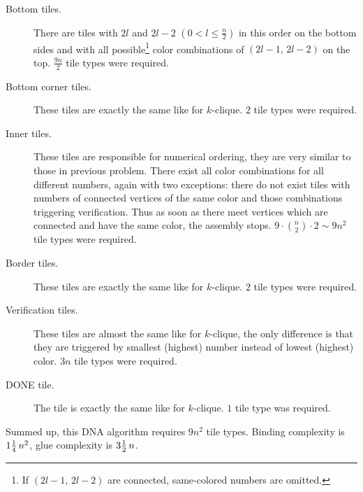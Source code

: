 \begin{description}
	\item[Bottom tiles.] There are tiles with $2l$ and $2l-2$ $(0 < l \leq \frac{n}{2})$ in this order on the bottom sides and with all possible\footnote{If $(2l-1,\,2l-2)$ are connected, same-colored numbers are omitted.} color combinations of $(2l-1,\,2l-2)$ on the top. $\frac{9n}{2}$ tile types were required.
	\item[Bottom corner tiles.] These tiles are exactly the same like for $k$-clique. $2$ tile types were required.
	\item[Inner tiles.] These tiles are responsible for numerical ordering, they are very similar to those in previous problem. There exist all color combinations for all different numbers, again with two exceptions: there do not exist tiles with numbers of connected vertices of the same color and those combinations triggering verification. Thus as soon as there meet vertices which are connected and have the same color, the assembly stops. $9\cdot\binom{n}{2}\cdot 2 \sim 9n^2$ tile types were required.
	\item[Border tiles.] These tiles are exactly the same like for $k$-clique. $2$ tile types were required.
	\item[Verification tiles.] These tiles are almost the same like for $k$-clique, the only difference is that they are triggered by smallest (highest) number instead of lowest (highest) color. $3n$ tile types were required.
	\item[DONE tile.] The tile is exactly the same like for $k$-clique. $1$ tile type was required.
\end{description}
Summed up, this DNA algorithm requires $9n^2$ tile types. Binding complexity is $1\nicefrac{1}{4}\,n^2$, glue complexity is $3\nicefrac{1}{2}\,n$.

